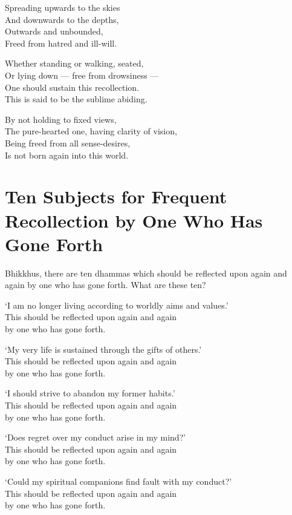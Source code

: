 Spreading upwards to the skies\\
And downwards to the depths,\\
Outwards and unbounded,\\
Freed from hatred and ill-will.

Whether standing or walking, seated, \\
Or lying down --- free from drowsiness ---\\
One should sustain this recollection.\\
This is said to be the sublime abiding.

By not holding to fixed views,\\
The pure-hearted one, having clarity of vision,\\
Being freed from all sense-desires,\\
Is not born again into this world.


\section{Ten Subjects for Frequent Recollection by One Who Has Gone Forth}

Bhikkhus, there are ten dhammas which should be reflected upon again and again by one who has gone forth. What are these ten?

`I am no longer living according to worldly aims and values.'\\
This should be reflected upon again and again\\
by one who has gone forth.

`My very life is sustained through the gifts of others.'\\
This should be reflected upon again and again\\
by one who has gone forth.

`I should strive to abandon my former habits.'\\
This should be reflected upon again and again\\
by one who has gone forth.

`Does regret over my conduct arise in my mind?'\\
This should be reflected upon again and again\\
by one who has gone forth.

`Could my spiritual companions find fault with my conduct?'\\
This should be reflected upon again and again\\
by one who has gone forth.

